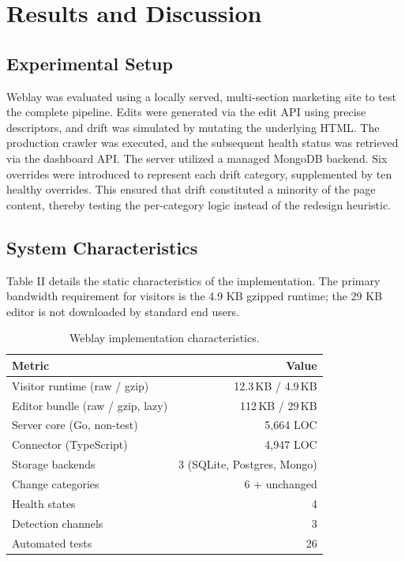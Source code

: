 \documentclass[conference]{IEEEtran}
\begin{document}
\section{Results and Discussion}\label{sec:eval}
\subsection{Experimental Setup}
Weblay was evaluated using a locally served, multi-section marketing site to test the complete pipeline. Edits were generated via the edit API using precise descriptors, and drift was simulated by mutating the underlying HTML. The production crawler was executed, and the subsequent health status was retrieved via the dashboard API. The server utilized a managed MongoDB backend. Six overrides were introduced to represent each drift category, supplemented by ten healthy overrides. This ensured that drift constituted a minority of the page content, thereby testing the per-category logic instead of the redesign heuristic.

\subsection{System Characteristics}
Table II details the static characteristics of the implementation. The primary bandwidth requirement for visitors is the 4.9 KB gzipped runtime; the 29 KB editor is not downloaded by standard end users.

\begin{table}[t]
\caption{Weblay implementation characteristics.}
\label{tab:sys}
\centering
\footnotesize
\begin{tabular}{@{}lr@{}}
\toprule
\textbf{Metric} & \textbf{Value} \\
\midrule
Visitor runtime (raw / gzip) & 12.3\,KB / 4.9\,KB \\
Editor bundle (raw / gzip, lazy) & 112\,KB / 29\,KB \\
Server core (Go, non-test) & 5{,}664 LOC \\
Connector (TypeScript) & 4{,}947 LOC \\
Storage backends & 3 (SQLite, Postgres, Mongo) \\
Change categories & 6 + unchanged \\
Health states & 4 \\
Detection channels & 3 \\
Automated tests & 26 \\
\bottomrule
\end{tabular}
\end{table}
\end{document}
